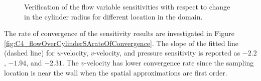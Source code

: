\begin{figure}[H]
{    }
    \quad
    \caption{Verification of the flow variable sensitivities with respect to change in the cylinder radius for different location in the domain.}
    \label{fig:C4_flowOverCylinderSensitivityValidation}
\end{figure}

The rate of convergence of the sensitivity results are investigated in Figure \ref{fig:C4_flowOverCylinderSArateOfConvergence}. The slope of the fitted line (dashed line) for $u$-velocity, $v$-velocity, and pressure sensitivity is reported as $-2.2$, $-1.94$, and $-2.31$. The $v$-velocity has lower convergence rate since the sampling location is near the wall when the spatial approximations are first order.

